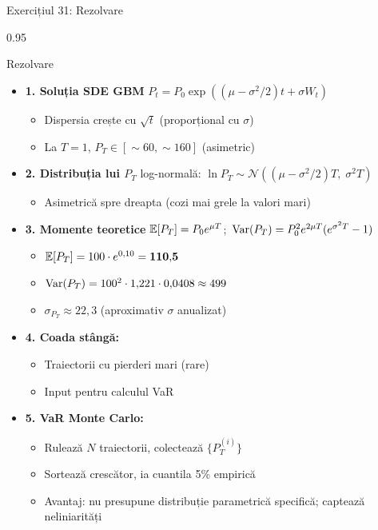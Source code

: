 \documentclass[9pt, aspectratio=169, t]{beamer}
\begin{document}
\begin{frame}[shrink=25]{Exercițiul 31: Rezolvare}
\begin{cminipage}{0.95\textwidth}
\begin{exampleblock}{Rezolvare}
\begin{itemize}\setlength{\itemsep}{0pt}
    \item \textbf{1. Soluția SDE GBM} \quad $P_t = P_0 \exp\left((\mu - \sigma^2/2)t + \sigma W_t\right)$
    \begin{itemize}\setlength{\itemsep}{0pt}
        \item Dispersia crește cu $\sqrt{t}$ (proporțional cu $\sigma$)
        \item La $T = 1$, $P_T \in [\sim 60, \sim 160]$ (asimetric)
    \end{itemize}
    \item \textbf{2. Distribuția lui $P_T$} \quad log-normală: $\ln P_T \sim \mathcal{N}\!\left((\mu - \sigma^2/2)T,\; \sigma^2 T\right)$
    \begin{itemize}\setlength{\itemsep}{0pt}
        \item Asimetrică spre dreapta (cozi mai grele la valori mari)
    \end{itemize}
    \item \textbf{3. Momente teoretice} \quad $\mathbb{E}[P_T] = P_0 e^{\mu T}$;\ $\text{Var}(P_T) = P_0^2 e^{2\mu T}(e^{\sigma^2 T} - 1)$
    \begin{itemize}\setlength{\itemsep}{0pt}
        \item $\mathbb{E}[P_T] = 100 \cdot e^{0{,}10} = \mathbf{110{,}5}$
        \item $\text{Var}(P_T) = 100^2 \cdot 1{,}221 \cdot 0{,}0408 \approx 499$
        \item $\sigma_{P_T} \approx 22{,}3$ (aproximativ $\sigma$ anualizat)
    \end{itemize}
    \item \textbf{4. Coada stângă:}
    \begin{itemize}\setlength{\itemsep}{0pt}
        \item Traiectorii cu pierderi mari (rare)
        \item Input pentru calculul VaR
    \end{itemize}
    \item \textbf{5. VaR Monte Carlo:}
    \begin{itemize}\setlength{\itemsep}{0pt}
        \item Rulează $N$ traiectorii, colectează $\{P_T^{(i)}\}$
        \item Sortează crescător, ia cuantila 5\% empirică
        \item Avantaj: nu presupune distribuție parametrică specifică; captează neliniarități
    \end{itemize}
\end{itemize}
\end{exampleblock}
\end{cminipage}
\end{frame}
\end{document}
